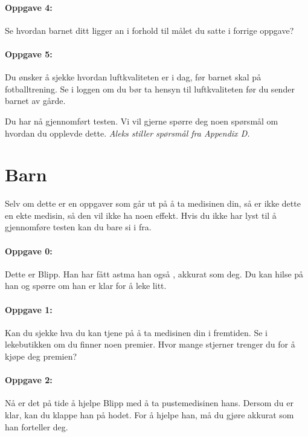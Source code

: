 \paragraph{Oppgave 4:}
Se hvordan barnet ditt ligger an i forhold til m\r{a}let du satte i forrige oppgave?


\paragraph{Oppgave 5:}
Du \o  nsker \r{a} sjekke hvordan luftkvaliteten er i dag, f\o r barnet skal p\r{a} fotballtrening. Se i loggen om du b\o r ta hensyn til luftkvaliteten f\o r du sender barnet av g\r{a}rde.  

 
Du har n\r{a} gjennomf\o rt testen. Vi vil gjerne sp\o rre deg noen sp\o rsm\r{a}l om hvordan du opplevde dette. \emph{Aleks stiller sp\o rsm\r{a}l fra Appendix D.}

\section{Barn}

Selv om dette er en oppgaver som g\r{a}r ut p\r{a} \r{a} ta medisinen din, s\r{a} er ikke dette en ekte medisin, s\r{a} den vil ikke ha noen effekt. Hvis du ikke har lyst til \r{a} gjennomf\o re testen kan du bare si i fra. 
 
\paragraph{Oppgave 0:}
Dette er Blipp. Han har f\r{a}tt astma han ogs\r{a} , akkurat som deg. Du kan hilse p\r{a}  han og sp\o rre om han er klar for \r{a} leke litt. 

\paragraph{Oppgave 1:}
Kan du sjekke hva du kan tjene p\r{a}  \r{a}  ta medisinen din i fremtiden. Se i lekebutikken om du finner noen premier. Hvor mange stjerner trenger du for \r{a} kj\o pe deg premien?

\paragraph{Oppgave 2:}
N\r{a}  er det p\r{a}  tide \r{a}  hjelpe Blipp med \r{a}  ta pustemedisinen hans. Dersom du er klar, kan du klappe han p\r{a}  hodet. For \r{a}  hjelpe han, m\r{a}  du gj\o re akkurat som han forteller deg.  

